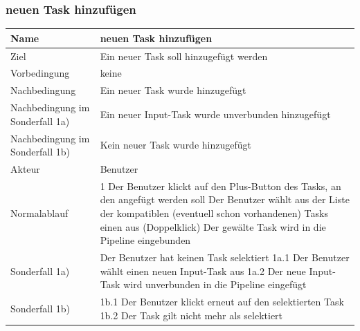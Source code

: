 \documentclass[a4paper,12pt]{scrartcl}
\begin{document}
\subsubsection{neuen Task hinzufügen}
\begin{center}
\begin{tabular}{|p{5cm}|p{10cm}|}
\hline Name & \textbf{neuen Task hinzufügen} \\ 
\hline Ziel & Ein neuer Task soll hinzugefügt werden \\ 
\hline Vorbedingung& keine \\
\hline Nachbedingung & Ein neuer Task wurde hinzugefügt \\ 
\hline Nachbedingung im Sonderfall 1a) & Ein neuer Input-Task wurde unverbunden hinzugefügt\\
\hline Nachbedingung im Sonderfall 1b) & Kein neuer Task wurde hinzugefügt\\
\hline Akteur & Benutzer \\ 
\hline Normalablauf & 1 Der Benutzer klickt auf den Plus-Button des Tasks, an den angefügt werden soll
\newline 2 Der Benutzer wählt aus der Liste der kompatiblen (eventuell schon vorhandenen) Tasks einen aus (Doppelklick)
\newline 3 Der gewälte Task wird in die Pipeline eingebunden\\ 
\hline Sonderfall 1a) & Der Benutzer hat keinen Task selektiert
\newline 1a.1 Der Benutzer wählt einen neuen Input-Task aus
\newline 1a.2 Der neue Input-Task wird unverbunden in die Pipeline eingefügt\\
\hline Sonderfall 1b) & 1b.1 Der Benutzer klickt erneut auf den selektierten Task
\newline 1b.2 Der Task gilt nicht mehr als selektiert\\
\hline
\end{tabular}
\end{center}
\end{document}

